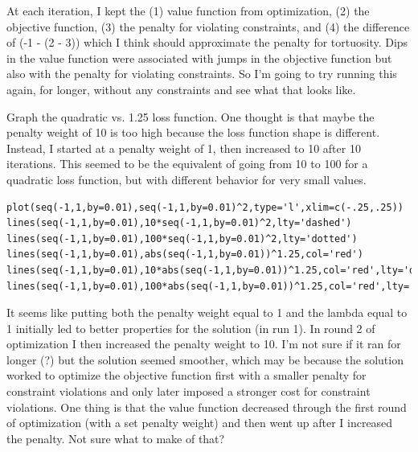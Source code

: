 \documentclass[12pt, oneside, titlepage]{article}   	%
\begin{document}
At each iteration, I kept the (1) value function from optimization, (2) the objective function, (3) the penalty for violating constraints, and (4) the difference of (-1 - (2 - 3)) which I think should approximate the penalty for tortuosity. Dips in the value function were associated with jumps in the objective function but also with the penalty for violating constraints. So I'm going to try running this again, for longer, without any constraints and see what that looks like. 

Graph the quadratic vs. 1.25 loss function. One thought is that maybe the penalty weight of 10 is too high because the loss function shape is different. Instead, I started at a penalty weight of 1, then increased to 10 after 10 iterations. This seemed to be the equivalent of going from 10 to 100 for a quadratic loss function, but with different behavior for very small values.

\begin{lstlisting}
plot(seq(-1,1,by=0.01),seq(-1,1,by=0.01)^2,type='l',xlim=c(-.25,.25))
lines(seq(-1,1,by=0.01),10*seq(-1,1,by=0.01)^2,lty='dashed')
lines(seq(-1,1,by=0.01),100*seq(-1,1,by=0.01)^2,lty='dotted')
lines(seq(-1,1,by=0.01),abs(seq(-1,1,by=0.01))^1.25,col='red')
lines(seq(-1,1,by=0.01),10*abs(seq(-1,1,by=0.01))^1.25,col='red',lty='dashed')
lines(seq(-1,1,by=0.01),100*abs(seq(-1,1,by=0.01))^1.25,col='red',lty='dotted')
\end{lstlisting}

It seems like putting both the penalty weight equal to 1 and the lambda equal to 1 initially led to better properties for the solution (in run 1). In round 2 of optimization I then increased the penalty weight to 10. I'm not sure if it ran for longer (?) but the solution seemed smoother, which may be because the solution worked to optimize the objective function first with a smaller penalty for constraint violations and only later imposed a stronger cost for constraint violations. One thing is that the value function decreased through the first round of optimization (with a set penalty weight) and then went up after I increased the penalty. Not sure what to make of that?


\singlespace
\end{document}
